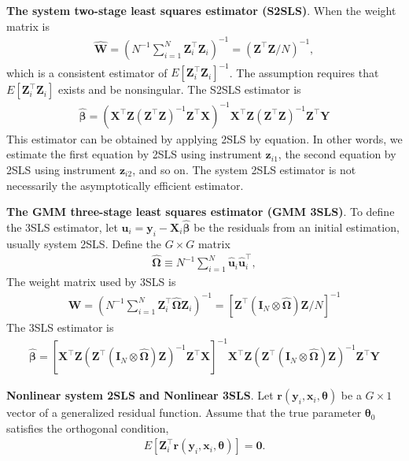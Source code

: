 \documentclass[11pt, a4paper]{article}
\numberwithin{figure}{section}
\theoremstyle{definition}
\newcommand{\0}{\mathbf{0}}
\newcommand{\bmI}{\bm{I}}
\newcommand{\bmW}{\bm{W}}
\newcommand{\bmX}{\bm{X}}
\newcommand{\bmY}{\bm{Y}}
\newcommand{\bmZ}{\bm{Z}}
\newcommand{\bmr}{\bm{r}}
\newcommand{\bmu}{\bm{u}}
\newcommand{\bmx}{\bm{x}}
\newcommand{\bmy}{\bm{y}}
\newcommand{\bmz}{\bm{z}}
\begin{document}
\textbf{The system two-stage least squares estimator (S2SLS)}. When the weight matrix is 
\begin{align*}
    \hat{\bmW} = \left(N^{-1}\sum_{i=1}^N \bmZ_i^\top \bmZ_i  \right)^{-1} = (\bmZ^\top \bmZ/N)^{-1},
\end{align*}
which is a consistent estimator of $E[\bmZ_i^\top \bmZ_i]^{-1}$. The assumption requires that $E[\bmZ_i^\top \bmZ_i]$ exists and be nonsingular.
The S2SLS estimator is 
\begin{align*}
    \hat{\bm{\beta}} = (\bmX^\top\bmZ(\bmZ^\top \bmZ)^{-1}\bmZ^\top\bmX)^{-1}\bmX^\top\bmZ(\bmZ^\top \bmZ)^{-1}\bmZ^\top\bmY
\end{align*}
This estimator can be obtained by applying 2SLS by equation. In other words, we estimate the first equation by 2SLS using instrument $\bmz_{i1}$, the second equation by 2SLS using instrument $\bmz_{i2}$, and so on.
The system 2SLS estimator is not necessarily the asymptotically efficient estimator.



\textbf{The GMM three-stage least squares estimator (GMM 3SLS)}. To define the 3SLS estimator, let $\hat{\bmu}_i = \bmy_i - \bmX_i \hat{\bm{\beta}}$  be the residuals from an initial estimation, usually system 2SLS. Define the $G\times G$ matrix
\begin{align*}
    \hat{\bm{\Omega}}\equiv N^{-1} \sum_{i=1}^N \hat{\bmu}_i\hat{\bmu}_i^\top,
\end{align*}
The weight matrix used by 3SLS is 
\begin{align*}
    \hat{\bmW} =  \left(N^{-1}\sum_{i=1}^N \bmZ_i^\top \hat{\bm{\Omega}}    \bmZ_i  \right)^{-1} = [\bmZ^\top (\bmI_N \otimes \hat{\bm{\Omega}})\bmZ/N]^{-1}
\end{align*}
The 3SLS estimator is
\begin{align*}
    \hat{\bm{\beta}} = [\bmX^\top\bmZ(\bmZ^\top (\bmI_N \otimes \hat{\bm{\Omega}})\bmZ)^{-1}\bmZ^\top\bmX]^{-1}\bmX^\top\bmZ(\bmZ^\top (\bmI_N \otimes \hat{\bm{\Omega}})\bmZ)^{-1}\bmZ^\top\bmY
\end{align*}





\textbf{Nonlinear system 2SLS and Nonlinear 3SLS}.
Let $\bmr(\bmy_i, \bmx_i, \bm{\theta})$ be a $G\times 1$ vector of a generalized residual function.
Assume that the true parameter $\bm{\theta}_0$ satisfies the orthogonal condition,
\begin{align*}
    E[\bmZ_i^\top \bmr(\bmy_i, \bmx_i, \bm{\theta})] = \bm0.
\end{align*}
\end{document}
